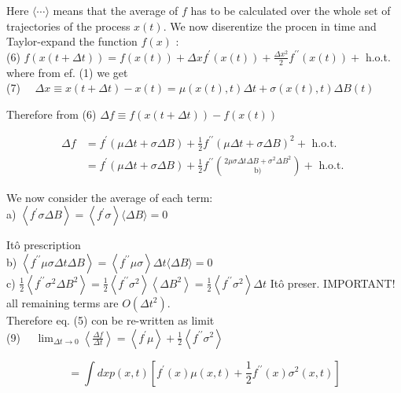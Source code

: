 \documentclass[10pt]{article}
\begin{document}
Here $\langle\cdots\rangle$ means that the average of $f$ has to be calculated over the whole set of trajectories of the process $x(t)$. We now diserentize the procen in time and Taylor-expand the function $f(x)$ :\\
(6) $f(x(t+\Delta t))=f(x(t))+\Delta x f^{\prime}(x(t))+\frac{\Delta x^{2}}{2} f^{\prime \prime}(x(t))+$ h.o.t.\\
where from ef. (1) we get\\
(7) $\quad \Delta x \equiv x(t+\Delta t)-x(t)=\mu(x(t), t) \Delta t+\sigma(x(t), t) \Delta B(t)$

Therefore from (6) $\Delta f \equiv f(x(t+\Delta t))-f(x(t))$

$$
\begin{aligned}
\Delta f & =f^{\prime}(\mu \Delta t+\sigma \Delta B)+\frac{1}{2} f^{\prime \prime}(\mu \Delta t+\sigma \Delta B)^{2}+\text { h.o.t. } \\
& =f^{\prime}(\mu \Delta t+\sigma \Delta B)+\frac{1}{2} f^{\prime \prime}\binom{2 \mu \sigma \Delta t \Delta B+\sigma^{2} \Delta B^{2}}{\text { b) }}+\text { h.o.t. }
\end{aligned}
$$

We now consider the average of each term:\\
a) $\left\langle f^{\prime} \sigma \Delta B\right\rangle=\left\langle f^{\prime} \sigma\right\rangle\langle\Delta B\rangle=0$

Itô prescription\\
b) $\left\langle f^{\prime \prime} \mu \sigma \Delta t \Delta B\right\rangle=\left\langle f^{\prime \prime} \mu \sigma\right\rangle \Delta t\langle\Delta B\rangle=0$\\
c) $\frac{1}{2}\left\langle f^{\prime \prime} \sigma^{2} \Delta B^{2}\right\rangle=\frac{1}{2}\left\langle f^{\prime \prime} \sigma^{2}\right\rangle\left\langle\Delta B^{2}\right\rangle=\frac{1}{2}\left\langle f^{\prime \prime} \sigma^{2}\right\rangle \Delta t$ Itô preser. IMPORTANT!\\
all remaining terms are $O\left(\Delta t^{2}\right)$.\\
Therefore eq. (5) con be re-written as limit\\
(9) $\quad \lim _{\Delta t \rightarrow 0}\left\langle\frac{\Delta f}{\Delta t}\right\rangle=\left\langle f^{\prime} \mu\right\rangle+\frac{1}{2}\left\langle f^{\prime \prime} \sigma^{2}\right\rangle$

$$
=\int d x p(x, t)\left[f^{\prime}(x) \mu(x, t)+\frac{1}{2} f^{\prime \prime}(x) \sigma^{2}(x, t)\right]
$$
\end{document}
